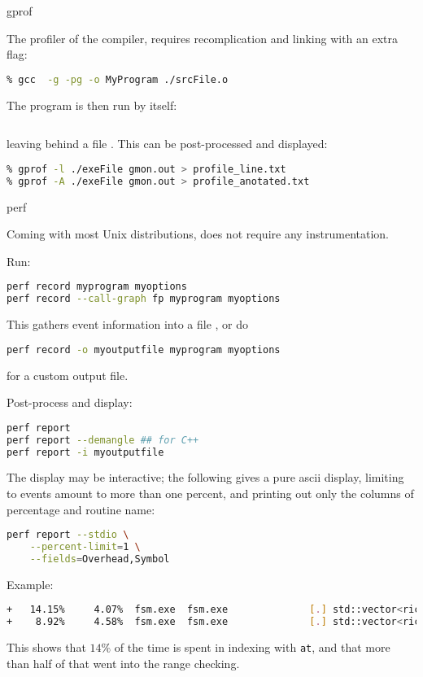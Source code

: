  {gprof}

The profiler of the  compiler, 
requires recomplication and linking with an extra flag:

\begin{lstlisting}[language=bash]
% gcc  -g -pg -c ./srcFile.c 
% gcc  -g -pg -o MyProgram ./srcFile.o 
\end{lstlisting}

The program is then run by itself:
\begin{lstlisting}[language=bash]
% ./MyProgram
\end{lstlisting}
leaving behind a file .
This can be post-processed and displayed:
\begin{lstlisting}[language=bash]
% gprof    ./exeFile gmon.out > profile.txt
% gprof -l ./exeFile gmon.out > profile_line.txt
% gprof -A ./exeFile gmon.out > profile_anotated.txt
\end{lstlisting}

 {perf}

Coming with most Unix distributions,
does not require any instrumentation.

Run:
\begin{lstlisting}[language=bash]
perf record myprogram myoptions
perf record --call-graph fp myprogram myoptions
\end{lstlisting}
This gathers event information into a file ,
or do
\begin{lstlisting}[language=bash]
perf record -o myoutputfile myprogram myoptions
\end{lstlisting}
for a custom output file.

Post-process and display:
\begin{lstlisting}[language=bash]
perf report
perf report --demangle ## for C++
perf report -i myoutputfile
\end{lstlisting}
The display may be interactive;
the following gives a pure ascii display,
limiting to events amount to more than one percent,
and printing out only the columns of percentage and routine name:
\begin{lstlisting}[language=bash]
perf report --stdio \
    --percent-limit=1 \
    --fields=Overhead,Symbol
\end{lstlisting}

Example:
\begin{lstlisting}[language=bash]
+   14.15%     4.07%  fsm.exe  fsm.exe              [.] std::vector<richdem::dephier::Depression<double>, std::allocator<richdem::dephier::Depression<double> > >::at
+    8.92%     4.58%  fsm.exe  fsm.exe              [.] std::vector<richdem::dephier::Depression<double>, std::allocator<richdem::dephier::Depression<double> > >::_M_range_check
\end{lstlisting}
This shows that $14\%$ of the time is spent in indexing with \lstinline{at},
and that more than half of that went into the range checking.

